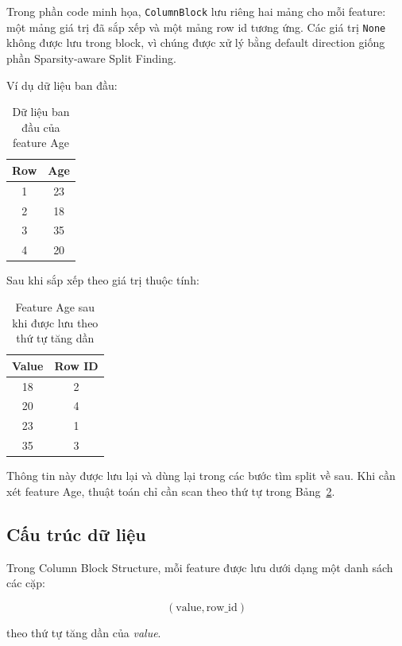 Trong phần code minh họa, \texttt{ColumnBlock} lưu riêng hai mảng cho mỗi feature: một mảng giá trị đã sắp xếp và một mảng row id tương ứng. Các giá trị \texttt{None} không được lưu trong block, vì chúng được xử lý bằng default direction giống phần Sparsity-aware Split Finding.

Ví dụ dữ liệu ban đầu:

\begin{table}[htbp]
    \centering
    \caption{Dữ liệu ban đầu của feature Age}
    \label{tab:age_original}
    \begin{tabular}{cc}
        \toprule
        \textbf{Row} & \textbf{Age} \\
        \midrule
        1 & 23 \\
        2 & 18 \\
        3 & 35 \\
        4 & 20 \\
        \bottomrule
    \end{tabular}
\end{table}

Sau khi sắp xếp theo giá trị thuộc tính:

\begin{table}[htbp]
    \centering
    \caption{Feature Age sau khi được lưu theo thứ tự tăng dần}
    \label{tab:age_sorted}
    \begin{tabular}{cc}
        \toprule
        \textbf{Value} & \textbf{Row ID} \\
        \midrule
        18 & 2 \\
        20 & 4 \\
        23 & 1 \\
        35 & 3 \\
        \bottomrule
    \end{tabular}
\end{table}

Thông tin này được lưu lại và dùng lại trong các bước tìm split về sau. Khi cần xét feature Age, thuật toán chỉ cần scan theo thứ tự trong Bảng~\ref{tab:age_sorted}.

\subsection{Cấu trúc dữ liệu}

Trong Column Block Structure, mỗi feature được lưu dưới dạng một danh sách các cặp:

\[
(\text{value}, \text{row\_id})
\]

theo thứ tự tăng dần của \textit{value}.

